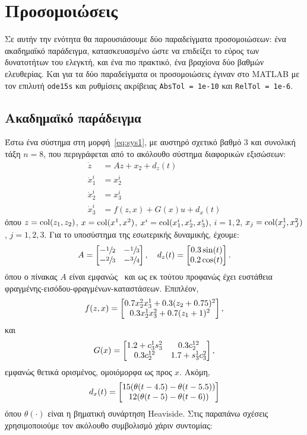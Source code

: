 \chapter{Προσομοιώσεις}
\label{chap:sims}
Σε αυτήν την ενότητα θα παρουσιάσουμε δύο παραδείγματα προσομοιώσεων: ένα ακαδημαϊκό παράδειγμα, κατασκευασμένο ώστε να επιδείξει το εύρος των δυνατοτήτων του ελεγκτή, και ένα πιο πρακτικό, ένα βραχίονα δύο βαθμών ελευθερίας. Και για τα δύο παραδείγματα οι προσομοιώσεις έγιναν στο \textlatin{MATLAB} με τον επιλυτή \texttt{\textlatin{ode15s}} και ρυθμίσεις ακρίβειας \texttt{\textlatin{AbsTol = 1e-10}} και \texttt{\textlatin{RelTol = 1e-6}}.

\section{Ακαδημαϊκό παράδειγμα}
    \label{exampleA}
Έστω ένα σύστημα στη μορφή~\eqref{eq:sys1}, με αυστηρό σχετικό βαθμό $3$ και συνολική τάξη $n = 8$, που περιγράφεται από το ακόλουθο σύστημα διαφορικών εξισώσεων:
\begin{align*}
    \dot z &= A z + x_2 + d_z(t)\\
    \dot x_1^i &= x_2^i \\
    \dot x_2^i &= x_3^i \\
    \dot x_3^i &= f(z, x) + G(x)u + d_x(t)
\end{align*}
όπου $z = \operatorname{col}(z_1, z_2)$, $x = \operatorname{col}(x^1, x^2)$, $x^i = \operatorname{col}(x_1^i, x_2^i, x_3^i)$, $i =1, 2$, $x_j = \operatorname{col}(x_j^1, x_J^2)$, $j = 1,2,3$. Για το υποσύστημα της εσωτερικής δυναμικής, έχουμε:
\[
    A = \bmqty{-\sfrac{1}{2} & -\sfrac{1}{3}\\ -\sfrac{2}{3} & -\sfrac{3}{4}},\quad d_z(t) = \bmqty{0.3 \sin(t)\\ 0.2\cos(t)}.
\]
όπου ο πίνακας $A$ είναι εμφανώς \hur\ και ως εκ τούτου προφανώς έχει ευστάθεια φραγμένης-εισόδου-φραγμένων-καταστάσεων. Επιπλέον,
\[
    f(z, x) = \bmqty{
        0.7 x_2^2 x_3^1 + 0.3 (z_2 + 0.75)^2\\
        0.3 x_2^1 x_3^2 + 0.7 (z_1 + 1)^2
    },
\]
και
\[
    G(x) = \bmqty{
        1.2 + c_3^1 s_3^2 & 0.3 c_2^{12}\\
        0.3 c_2^{12} & 1.7 + s_3^1 c_3^2
    },
\]
εμφανώς θετικά ορισμένος, ομοιόμορφα ως προς $x$. Ακόμη,
\[
    d_x(t) = \bmqty{
        15(\theta(t - 4.5) - \theta(t - 5.5))\\
        12(\theta(t - 5) - \theta(t -6))
    }  
\]
όπου $\theta(\cdot)$ είναι η βηματική συνάρτηση \textlatin{Heaviside}. Στις παραπάνω σχέσεις χρησιμοποιούμε τον ακόλουθο συμβολισμό χάριν συντομίας:
